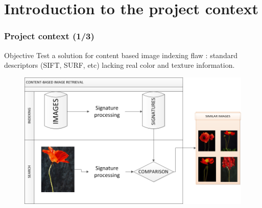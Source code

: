 \documentclass[xcolor=table]{beamer}
\begin{document}
\section{Introduction to the project context}
\begin{frame} \frametitle{Project context (1/3)}
\begin{block}{Objective}
  Test a solution for content based image indexing flaw : standard descriptors (SIFT, SURF, etc) lacking real color and texture information.
\end{block}
	
\begin{figure}
	\includegraphics[scale=0.38]{CBIR.png}
\end{figure}



\end{frame}
\end{document}
